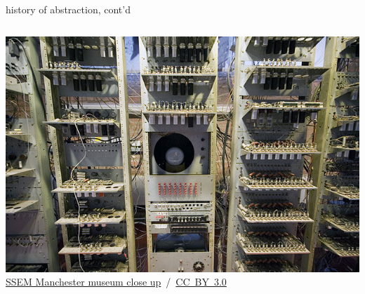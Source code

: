 \documentclass[10pt,t,svgnames]{beamer}
\begin{document}
  \begin{frame}{history of abstraction, cont'd}
    \vspace{3ex}
    \begin{columns}
      \begin{column}{.82\textwidth}
        \includegraphics[width=\textwidth]{SSEM.jpg}\\
        \hfill
        \tiny{\href{https://en.wikipedia.org/wiki/Manchester\_Baby\#/media/File:SSEM\_Manchester\_museum\_close\_up.jpg}{SSEM Manchester museum close up}~/~\href{http://creativecommons.org/licenses/by-sa/3.0}{CC~BY~3.0}}
      \end{column}
    \end{columns}

  \end{frame}
\end{document}
